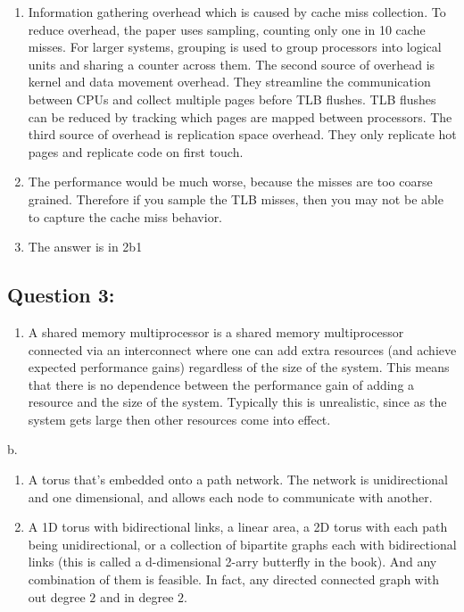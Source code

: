 \begin{enumerate}
\def\labelenumi{\arabic{enumi}.}
\item
  Information gathering overhead which is caused by cache miss
  collection. To reduce overhead, the paper uses sampling, counting only
  one in 10 cache misses. For larger systems, grouping is used to group
  processors into logical units and sharing a counter across them. The
  second source of overhead is kernel and data movement overhead. They
  streamline the communication between CPUs and collect multiple pages
  before TLB flushes. TLB flushes can be reduced by tracking which pages
  are mapped between processors. The third source of overhead is
  replication space overhead. They only replicate hot pages and
  replicate code on first touch.
\item
  The performance would be much worse, because the misses are too coarse
  grained. Therefore if you sample the TLB misses, then you may not be
  able to capture the cache miss behavior.
\item
  The answer is in 2b1
\end{enumerate}

\subsection{Question 3:}\label{question-3}

\begin{enumerate}
\def\labelenumi{\alph{enumi}.}
\itemsep1pt\parskip0pt
\item
  A shared memory multiprocessor is a shared memory multiprocessor
  connected via an interconnect where one can add extra resources (and
  achieve expected performance gains) regardless of the size of the
  system. This means that there is no dependence between the performance
  gain of adding a resource and the size of the system. Typically this
  is unrealistic, since as the system gets large then other resources
  come into effect.
\end{enumerate}

b.

\begin{enumerate}
\def\labelenumi{\arabic{enumi}.}
\item
  A torus that's embedded onto a path network. The network is
  unidirectional and one dimensional, and allows each node to
  communicate with another.
\item
  A 1D torus with bidirectional links, a linear area, a 2D torus with
  each path being unidirectional, or a collection of bipartite graphs
  each with bidirectional links (this is called a d-dimensional 2-arry
  butterfly in the book). And any combination of them is feasible. In
  fact, any directed connected graph with out degree $2$ and in degree
  $2$.
\end{enumerate}

